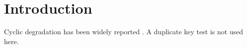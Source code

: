 \section{Introduction}
Cyclic degradation has been widely reported \cite{li2024,wang2023}.
A duplicate key test is not used here.
